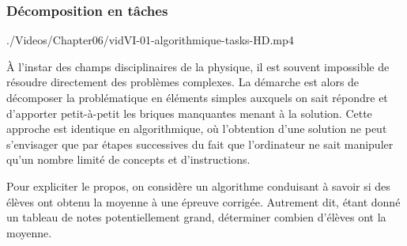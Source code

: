 \subsubsection[Décomposition en tâches]{Décomposition en tâches}
\label{subsub:VI.1.1.1}

\begin{marginvideo}
		{./Videos/Chapter06/vidVI-01-algorithmique-tasks-HD.mp4}%
\end{marginvideo}

À l'instar des champs disciplinaires de la physique, il est souvent impossible de résoudre directement des problèmes complexes. La démarche est alors de décomposer la problématique \nopagebreak en éléments simples auxquels on sait répondre et d'apporter petit-à-petit les briques manquantes menant à la solution. 
Cette approche est identique en algorithmique, où l'obtention d'une solution ne peut s'envisager que par étapes successives du fait que l'ordinateur ne sait manipuler qu'un nombre limité de concepts et d'instructions.

Pour expliciter le propos, on considère un algorithme conduisant à savoir si des élèves ont obtenu la moyenne à une épreuve corrigée. Autrement dit, étant donné un tableau de notes potentiellement grand, déterminer combien d'élèves ont la moyenne.

